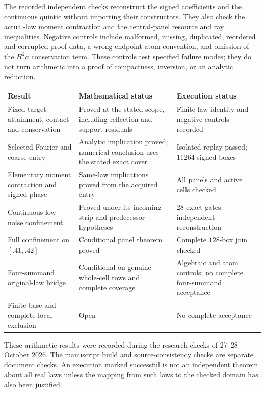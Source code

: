 The recorded independent checks reconstruct the signed coefficients and
the continuous quintic without importing their constructors. They also
check the actual-law moment contraction and the central-panel resource
and ray inequalities. Negative controls include malformed, missing,
duplicated, reordered and corrupted proof data, a wrong endpoint-atom
convention, and omission of the $H^2a$ conservation term. These controls
test specified failure modes; they do not turn arithmetic into a proof
of compactness, inversion, or an analytic reduction.

\begin{center}\small
\begin{tabular}{@{}P{.29\textwidth}P{.36\textwidth}P{.28\textwidth}@{}}\toprule
Result & Mathematical status & Execution status\\\midrule
Fixed-target attainment, contact and conservation & Proved at the stated
scope, including reflection and support residuals & Finite-law identity
and negative controls recorded\\[3pt]
Selected Fourier and coarse entry & Analytic implication proved; numerical
conclusion uses the stated exact cover & Isolated replay passed; $11264$
signed boxes\\[3pt]
Elementary moment contraction and signed phase & Same-law implications
proved from the acquired entry & All panels and active cells checked\\[3pt]
Continuous low-noise confinement & Proved under its incoming strip and
predecessor hypotheses & $28$ exact gates; independent reconstruction\\[3pt]
Full confinement on $[.41,.42]$ & Conditional panel theorem proved &
Complete $128$-box join checked\\[3pt]
Four-summand original-law bridge & Conditional on genuine whole-cell
rows and complete coverage & Algebraic and atom controls; no complete
four-summand acceptance\\[3pt]
Finite base and complete local exclusion & Open & No complete acceptance\\
\bottomrule\end{tabular}
\end{center}

These arithmetic results were recorded during the research checks of
27--28 October 2026. The manuscript build and source-consistency checks
are separate document checks. An execution marked successful is not an
independent theorem about all real laws unless the mapping from such laws
to the checked domain has also been justified.

